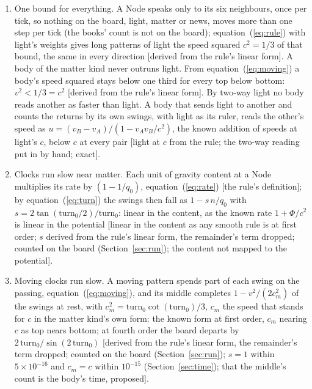 \documentclass[pdflatex,sn-mathphys-num]{sn-jnl}
\begin{document}
\begin{enumerate}
\item One bound for everything. A Node speaks only to its six neighbours, once per tick, so nothing on the board, light, matter or news, moves more than one step per tick (the books' count is not on the board); equation~(\ref{eq:rule}) with light's weights gives long patterns of light the speed squared $c^2 = 1/3$ of that bound, the same in every direction [derived from the rule's linear form]. A body of the matter kind never outruns light. From equation~(\ref{eq:moving}) a body's speed squared stays below one third for every top below bottom: $v^2 < 1/3 = c^2$ [derived from the rule's linear form]. By two-way light no body reads another as faster than light. A body that sends light to another and counts the returns by its own swings, with light as its ruler, reads the other's speed as $u = (v_B - v_A)/(1 - v_A v_B/c^2)$, the known addition of speeds at light's $c$, below $c$ at every pair [light at $c$ from the rule; the two-way reading put in by hand; exact].
\item Clocks run slow near matter. Each unit of gravity content at a Node multiplies its rate by $(1 - 1/q_0)$, equation~(\ref{eq:rate}) [the rule's definition]; by equation~(\ref{eq:turn}) the swings then fall as $1 - s\,n/q_0$ with $s = 2\tan(\mathrm{turn}_0/2)/\mathrm{turn}_0$: linear in the content, as the known rate $1 + \Phi/c^2$ is linear in the potential [linear in the content as any smooth rule is at first order; $s$ derived from the rule's linear form, the remainder's term dropped; counted on the board (Section~\ref{sec:run}); the content not mapped to the potential].
\item Moving clocks run slow. A moving pattern spends part of each swing on the passing, equation~(\ref{eq:moving}), and its middle completes $1 - v^2/(2c_m^2)$ of the swings at rest, with $c_m^2 = \mathrm{turn}_0\cot(\mathrm{turn}_0)/3$, $c_m$ the speed that stands for $c$ in the matter kind's own form: the known form at first order, $c_m$ nearing $c$ as top nears bottom; at fourth order the board departs by $2\,\mathrm{turn}_0/\sin(2\,\mathrm{turn}_0)$ [derived from the rule's linear form, the remainder's term dropped; counted on the board (Section~\ref{sec:run}); $s = 1$ within $5 \times 10^{-16}$ and $c_m = c$ within $10^{-15}$ (Section~\ref{sec:time}); that the middle's count is the body's time, proposed].

\end{enumerate}
\end{document}
